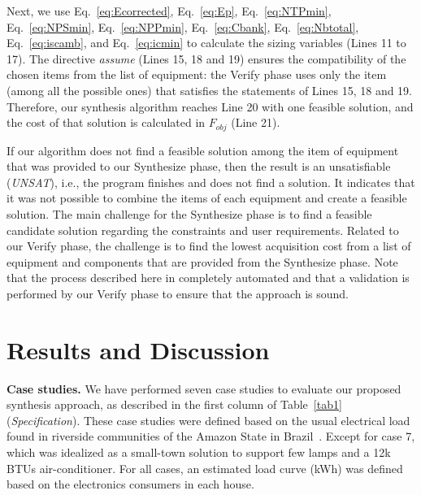 \documentclass[runningheads]{llncs}
\begin{document}
Next, we use Eq.~\ref{eq:Ecorrected}, Eq.~\ref{eq:Ep}, Eq.~\ref{eq:NTPmin}, Eq.~\ref{eq:NPSmin}, Eq.~\ref{eq:NPPmin}, Eq.~\ref{eq:Cbank}, Eq.~\ref{eq:Nbtotal}, Eq.~\ref{eq:iscamb}, and Eq.~\ref{eq:icmin} to calculate the sizing variables (Lines 11 to 17). The directive \textit{assume} (Lines 15, 18 and 19) ensures the compatibility of the chosen items from the list of equipment: the {\sc Verify} phase uses only the item (among all the possible ones) that satisfies the statements of Lines 15, 18 and 19. Therefore, our synthesis algorithm reaches Line 20 with one feasible solution, and the cost of that solution is calculated in $F_{obj}$ (Line 21). 

If our algorithm does not find a feasible solution among the item of equipment that was provided to our {\sc Synthesize} phase, then the result is an unsatisfiable (\textit{UNSAT}), i.e., the program finishes and does not find a solution. It indicates that it was not possible to combine the items of each equipment and create a feasible solution. The main challenge for the {\sc Synthesize} phase is to find a feasible candidate solution regarding the constraints and user requirements. Related to our {\sc Verify} phase, the challenge is to find the lowest acquisition cost from a list of equipment and components that are provided from the {\sc Synthesize} phase. 
Note that the process described here in completely automated and that a validation is performed by our {\sc Verify} phase to ensure that the approach is sound.

\section{Results and Discussion}

\textbf{Case studies.} We have performed seven case studies to evaluate our proposed synthesis approach, as described in the first column of Table~\ref{tab1} 
(\textit{Specification}). These case studies were defined based on the usual electrical load found in riverside communities of the Amazon State in Brazil~\cite{Agrener2013,TrindadeCordeiro19}. Except for case 7, which was idealized as a small-town solution to support few lamps and a 12k BTUs air-conditioner. For all cases, an estimated load curve (kWh) was defined based on the electronics consumers in each house.
\end{document}
